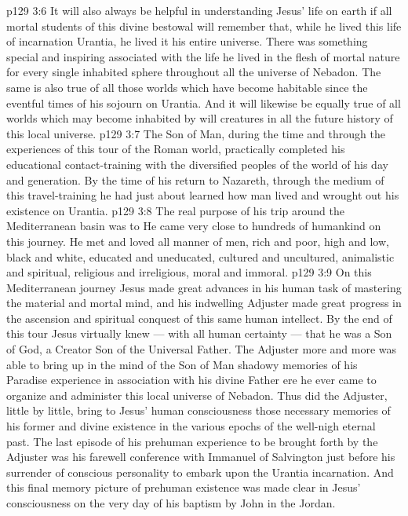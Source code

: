 \vs p129 3:6 \pc It will also always be helpful in understanding Jesus’ life on earth if all mortal students of this divine bestowal will remember that, while he lived this life of incarnation  Urantia, he lived it  his entire universe. There was something special and inspiring associated with the life he lived in the flesh of mortal nature for every single inhabited sphere throughout all the universe of Nebadon. The same is also true of all those worlds which have become habitable since the eventful times of his sojourn on Urantia. And it will likewise be equally true of all worlds which may become inhabited by will creatures in all the future history of this local universe.
\vs p129 3:7 \pc The Son of Man, during the time and through the experiences of this tour of the Roman world, practically completed his educational contact\hyp{}training with the diversified peoples of the world of his day and generation. By the time of his return to Nazareth, through the medium of this travel\hyp{}training he had just about learned how man lived and wrought out his existence on Urantia.
\vs p129 3:8 The real purpose of his trip around the Mediterranean basin was to  He came very close to hundreds of humankind on this journey. He met and loved all manner of men, rich and poor, high and low, black and white, educated and uneducated, cultured and uncultured, animalistic and spiritual, religious and irreligious, moral and immoral.
\vs p129 3:9 On this Mediterranean journey Jesus made great advances in his human task of mastering the material and mortal mind, and his indwelling Adjuster made great progress in the ascension and spiritual conquest of this same human intellect. By the end of this tour Jesus virtually knew --- with all human certainty --- that he was a Son of God, a Creator Son of the Universal Father. The Adjuster more and more was able to bring up in the mind of the Son of Man shadowy memories of his Paradise experience in association with his divine Father ere he ever came to organize and administer this local universe of Nebadon. Thus did the Adjuster, little by little, bring to Jesus’ human consciousness those necessary memories of his former and divine existence in the various epochs of the well\hyp{}nigh eternal past. The last episode of his prehuman experience to be brought forth by the Adjuster was his farewell conference with Immanuel of Salvington just before his surrender of conscious personality to embark upon the Urantia incarnation. And this final memory picture of prehuman existence was made clear in Jesus’ consciousness on the very day of his baptism by John in the Jordan.
